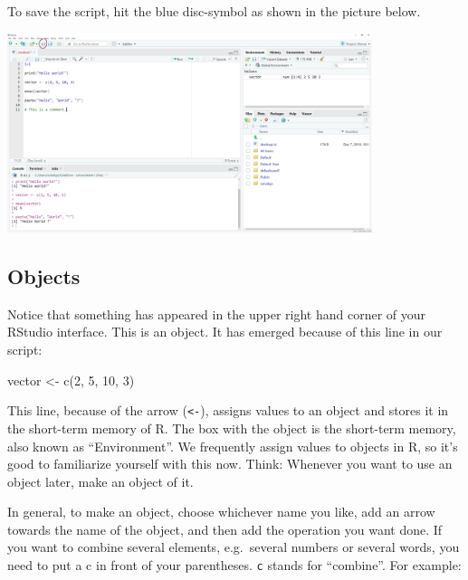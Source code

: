 \documentclass[
]{article}
\newenvironment{Shaded}{\begin{snugshade}}{\end{snugshade}}
\newcommand{\DecValTok}[1]{\textcolor[rgb]{0.00,0.00,0.81}{#1}}
\newcommand{\FunctionTok}[1]{\textcolor[rgb]{0.00,0.00,0.00}{#1}}
\newcommand{\NormalTok}[1]{#1}
\newcommand{\OtherTok}[1]{\textcolor[rgb]{0.56,0.35,0.01}{#1}}
\begin{document}
To save the script, hit the blue disc-symbol as shown in the picture
below.

\includegraphics[width=0.8\textwidth,height=\textheight]{./figures/rstudio_5.png}

\hypertarget{objects}{%
\subsection{Objects}\label{objects}}

Notice that something has appeared in the upper right hand corner of
your RStudio interface. This is an object. It has emerged because of
this line in our script:

\begin{Shaded}
\begin{Highlighting}[]
\NormalTok{vector }\OtherTok{\textless{}{-}} \FunctionTok{c}\NormalTok{(}\DecValTok{2}\NormalTok{, }\DecValTok{5}\NormalTok{, }\DecValTok{10}\NormalTok{, }\DecValTok{3}\NormalTok{)}
\end{Highlighting}
\end{Shaded}

This line, because of the arrow (\texttt{\textless{}-}), assigns values
to an object and stores it in the short-term memory of R. The box with
the object is the short-term memory, also known as ``Environment''. We
frequently assign values to objects in R, so it's good to familiarize
yourself with this now. Think: Whenever you want to use an object later,
make an object of it.

In general, to make an object, choose whichever name you like, add an
arrow towards the name of the object, and then add the operation you
want done. If you want to combine several elements, e.g.~several numbers
or several words, you need to put a c in front of your parentheses.
\texttt{c} stands for ``combine''. For example:
\end{document}
